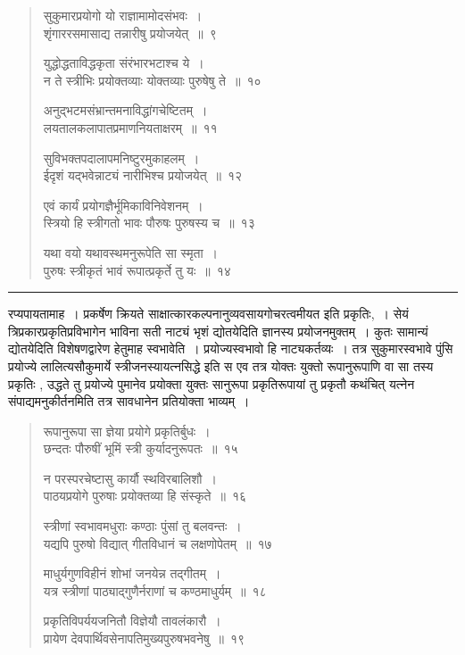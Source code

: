 \documentclass[11pt, openany]{book}
\begin{document}
\begin{quote}
{\na सुकुमारप्रयोगो यो राज्ञामामोदसंभवः~।\\
शृंगाररसमासाद्य तन्नारीषु प्रयोजयेत्~॥~९ 

युद्धोद्धताविद्धकृता संरंभारभटाश्च ये~।\\
न ते स्त्रीभिः प्रयोक्तव्याः योक्तव्याः पुरुषेषु ते~॥~१०

अनुद्भटमसंभ्रान्तमनाविद्धांगचेष्टितम्~।\\
लयतालकलापातप्रमाणनियताक्षरम्~॥~११

सुविभक्तपदालापमनिष्टुरमुकाहलम्~।\\
ईदृशं यद्भवेन्नाट्यं नारीभिश्च प्रयोजयेत्~॥~१२

एवं कार्यं प्रयोगज्ञैर्भूमिकाविनिवेशनम्~।\\
स्त्रियो हि स्त्रीगतो भावः पौरुषः पुरुषस्य च~॥~१३

यथा वयो यथावस्थमनुरूपेति सा स्मृता~।\\
पुरुषः स्त्रीकृतं भावं रूपात्प्रकृर्ते तु यः~॥~१४}
\end{quote}

\hrule

\vspace{2mm}
\noindent
रप्यपायतामाह~। प्रकर्षेण क्रियते साक्षात्कारकल्पनानुव्यवसायगोचरत्वमीयत इति प्रकृतिः,~। सेयं त्रिप्रकारप्रकृतिप्रविभागेन भाविना सती नाट्यं भृशं द्योतयेदिति ज्ञानस्य प्रयोजनमुक्तम्~। कुतः सामान्यं द्योतयेदिति विशेषणद्वारेण हेतुमाह स्वभावेति~। प्रयोज्यस्वभावो हि नाट्यकर्तव्यः~। तत्र सुकुमारस्वभावे पुंसि प्रयोज्ये लालित्यसौकुमार्ये स्त्रीजनस्यायत्नसिद्धे इति स एव तत्र योक्तः युक्तो रूपानुरूपाणि वा सा तस्य प्रकृतिः , उद्धते तु प्रयोज्ये पुमानेव प्रयोक्ता युक्तः सानुरूपा प्रकृतिरूपायां तु प्रकृतौ कथंचित् यत्नेन संपाद्यमनुकीर्तनमिति तत्र सावधानेन प्रतियोक्ता भाव्यम्~।

\newpage 

\begin{quote}
{\na रूपानुरूपा सा ज्ञेया प्रयोगे प्रकृतिर्बुधः~।\\
छन्दतः पौरुषीं भूमिं स्त्री कुर्यादनुरूपतः~॥~१५

न परस्परचेष्टासु कार्यौ स्थविरबालिशौ~।\\
पाठयप्रयोगे पुरुषाः प्रयोक्तव्या हि संस्कृते~॥~१६

स्त्रीणां स्वभावमधुराः कण्ठाः पुंसां तु बलवन्तः~।\\
यद्यपि पुरुषो विद्यात् गीतविधानं च लक्षणोपेतम्~॥~१७

माधुर्यगुणविहीनं शोभां जनयेन्न तद्गीतम्~।\\
यत्र स्त्रीणां पाठ्याद्गुणैर्नराणां च कण्ठमाधुर्यम्~॥~१८

प्रकृतिविपर्ययजनितौ विज्ञेयौ तावलंकारौ~।\\
प्रायेण देवपार्थिवसेनापतिमुख्यपुरुषभवनेषु~॥~१९}
\end{quote}
\end{document}
